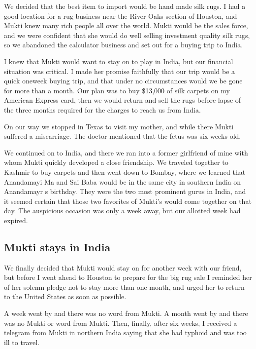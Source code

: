 \documentclass[a5paper,10pt,english]{book}
\begin{document}
\sphinxAtStartPar
We decided that the best item to import would be hand made silk rugs. I
had a good location for a rug business near the River Oaks section of
Houston, and Mukti knew many rich people all over the world. Mukti
would be the sales force, and we were confident that she would do well
selling investment quality silk rugs, so we abandoned the calculator
business and set out for a buying trip to India.

\sphinxAtStartPar
I knew that Mukti would want to stay on to play in India, but our
financial situation was critical. I made her promise faithfully that our
trip would be a quick one\sphinxhyphen{}week buying trip, and that under no
circumstances would we be gone for more than a month. Our plan was to
buy \$13,000 of silk carpets on my American Express card, then we would
return and sell the rugs before lapse of the three months required for
the charges to reach us from India.

\sphinxAtStartPar
On our way we stopped in Texas to visit my mother, and while there Mukti
suffered a miscarriage. The doctor mentioned that the fetus was six
weeks old.

\sphinxAtStartPar
We continued on to India, and there we ran into a former girlfriend of
mine with whom Mukti quickly developed a close friendship. We traveled
together to Kashmir to buy carpets and then went down to Bombay, where
we learned that Anandamayi Ma and Sai Baba would be in the same city in
southern India on Anandamayr s birthday. They were the two most
prominent gurus in India, and it seemed certain that those two favorites
of Mukti’s would come together on that day. The auspicious occasion was
only a week away, but our allotted week had expired.


\subsection{Mukti stays in India}
\label{\detokenize{psychopaths:mukti-stays-in-india}}
\sphinxAtStartPar
We finally decided that Mukti would stay on for another week with our
friend, but before I went ahead to Houston to prepare for the big rug
sale I reminded her of her solemn pledge not to stay more than one
month, and urged her to return to the United States as soon as possible.

\sphinxAtStartPar
A week went by and there was no word from Mukti. A month went by and
there was no Mukti or word from Mukti. Then, finally, after six weeks, I
received a telegram from Mukti in northern India saying that she had
typhoid and was too ill to travel.
\end{document}

